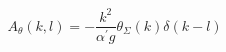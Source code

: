 \begin{equation}
A_\theta(k,l) = -\frac{k^2}{{\alpha^{\prime}} g } \theta_\Sigma (k)
\delta(k-l)
\end{equation}

